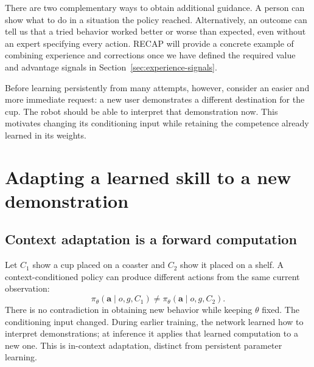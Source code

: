 There are two complementary ways to obtain additional guidance. A person can show what to do in a situation the policy reached. Alternatively, an outcome can tell us that a tried behavior worked better or worse than expected, even without an expert specifying every action. RECAP will provide a concrete example of combining experience and corrections once we have defined the required value and advantage signals in Section~\ref{sec:experience-signals}.

Before learning persistently from many attempts, however, consider an easier and more immediate request: a new user demonstrates a different destination for the cup. The robot should be able to interpret that demonstration now. This motivates changing its conditioning input while retaining the competence already learned in its weights.

\section{Adapting a learned skill to a new demonstration}



\subsection{Context adaptation is a forward computation}
Let $C_1$ show a cup placed on a coaster and $C_2$ show it placed on a shelf. A context-conditioned policy can produce different actions from the same current observation:
\begin{equation}
 \pi_\theta(\mathbf a\mid o,g,C_1)\ne\pi_\theta(\mathbf a\mid o,g,C_2).
 \label{eq:context}
\end{equation}
There is no contradiction in obtaining new behavior while keeping $\theta$ fixed. The conditioning input changed. During earlier training, the network learned how to interpret demonstrations; at inference it applies that learned computation to a new one. This is in-context adaptation, distinct from persistent parameter learning.

